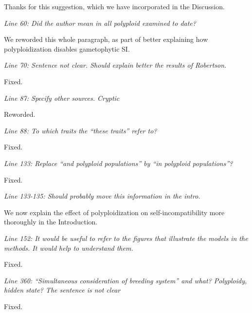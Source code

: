 \documentclass[11pt]{article}
\renewenvironment{quote}{\bigskip\noindent\itshape\ignorespaces}{\smallskip}
\begin{document}
Thanks for this suggestion, which we have incorporated in the Discussion. %


\begin{quote}
Line 60: Did the author mean in all polyploid examined to date?
\end{quote}

We reworded this whole paragraph, as part of better explaining how polyploidization disables gametophytic SI.

\begin{quote}
Line 70: Sentence not clear. Should explain better the results of Robertson.
\end{quote}

Fixed.

\begin{quote}
Line 87: Specify other sources. Cryptic
\end{quote}

Reworded.

\begin{quote}
Line 88: To which traits the ``these traits'' refer to?
\end{quote}

Fixed.

\begin{quote}
Line 133: Replace ``and polyploid populations'' by ``in polyploid populations''?
\end{quote}

Fixed.

\begin{quote}
Line 133-135: Should probably move this information in the intro.
\end{quote}

We now explain the effect of polyploidization on self-incompatibility more thoroughly in the Introduction.

\begin{quote}
Line 152: It would be useful to refer to the figures that illustrate the models in the methods.
It would help to understand them.
\end{quote}

Fixed. %

\begin{quote}
Line 360: ``Simultaneous consideration of breeding system'' and what?
Polyploidy, hidden state?
The sentence is not clear
\end{quote}

Fixed.
\end{document}
